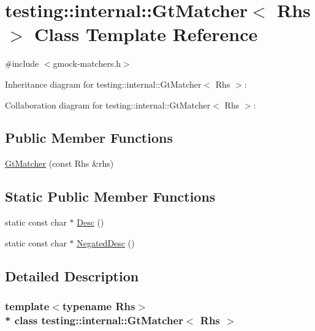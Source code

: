 \hypertarget{classtesting_1_1internal_1_1_gt_matcher}{}\section{testing\+:\+:internal\+:\+:Gt\+Matcher$<$ Rhs $>$ Class Template Reference}
\label{classtesting_1_1internal_1_1_gt_matcher}


{\ttfamily \#include $<$gmock-\/matchers.\+h$>$}



Inheritance diagram for testing\+:\+:internal\+:\+:Gt\+Matcher$<$ Rhs $>$\+:


Collaboration diagram for testing\+:\+:internal\+:\+:Gt\+Matcher$<$ Rhs $>$\+:
\subsection*{Public Member Functions}
\begin{DoxyCompactItemize}
\item 
\hyperlink{classtesting_1_1internal_1_1_gt_matcher_aeef0f6dd7c57a2ed0f379d8100de0215}{Gt\+Matcher} (const Rhs \&rhs)
\end{DoxyCompactItemize}
\subsection*{Static Public Member Functions}
\begin{DoxyCompactItemize}
\item 
static const char $\ast$ \hyperlink{classtesting_1_1internal_1_1_gt_matcher_ac4e664e328e4400e1cecc9b804de6937}{Desc} ()
\item 
static const char $\ast$ \hyperlink{classtesting_1_1internal_1_1_gt_matcher_ace1dc02e105fd93b638f23433bf682a4}{Negated\+Desc} ()
\end{DoxyCompactItemize}


\subsection{Detailed Description}
\subsubsection*{template$<$typename Rhs$>$\\*
class testing\+::internal\+::\+Gt\+Matcher$<$ Rhs $>$}



